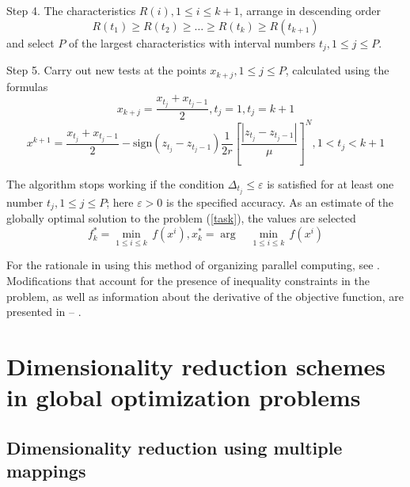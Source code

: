 \documentclass{svproc}
\begin{document}
Step 4. The characteristics \(R(i),1\leqslant i\leqslant k+1\), arrange in descending order 
\begin{displaymath}
\label{step4}
R(t_1)\geqslant R(t_2)\geqslant \dots \geqslant R(t_{k})\geqslant R(t_{k+1})
\end{displaymath}
and select \(P\) of the largest characteristics with interval numbers \(t_j,1\leqslant j\leqslant P\).

Step 5. Carry out new tests at the points \(x_{k+j},1\leqslant j\leqslant P\), calculated using the formulas
\begin{displaymath}
x_{k+j}=\dfrac{x_{t_j}+x_{t_j-1}}{2},t_j=1,t_j=k+1
\end{displaymath}
\begin{displaymath}
\label{step5}
{{x}^{k+1}}=\frac{{{x}_{{{t}_{j}}}}+{{x}_{{{t}_{j}}-1}}}{2}-\text{sign}({{z}_{{{t}_{j}}}}-{{z}_{{{t}_{j}}-1}})\frac{1}{2r}{{\left[ \frac{|{{z}_{{{t}_{j}}}}-{{z}_{{{t}_{j}}-1}}|}{\mu } \right]}^{N}}, 1<{{t}_{j}}<k+1
\end{displaymath}

The algorithm stops working if the condition \(\Delta_{t_j}\leqslant \varepsilon\)  is satisfied for at least one number \(t_j,1\leqslant j\leqslant P\); here \(\varepsilon>0\)  is the specified accuracy. As an estimate of the globally optimal solution to the problem (\ref{task}), the values are selected 
\begin{displaymath}
f_{k}^{*}=\underset{1\le i\le k}{\mathop{\min }}\,f({{x}^{i}}),   x_{k}^{*}=\arg \quad \underset{1\le i\le k}{\mathop{\min }}\,f({{x}^{i}})
\end{displaymath}

For the rationale in using this method of organizing parallel computing, see \cite{Ref11}. Modifications that account for the presence of inequality constraints in the problem, as well as information about the derivative of the objective function, are presented in \cite{Ref12} – \cite{Ref14}.

\section{Dimensionality reduction schemes in global optimization problems}

\subsection{Dimensionality reduction using multiple mappings}
\end{document}
